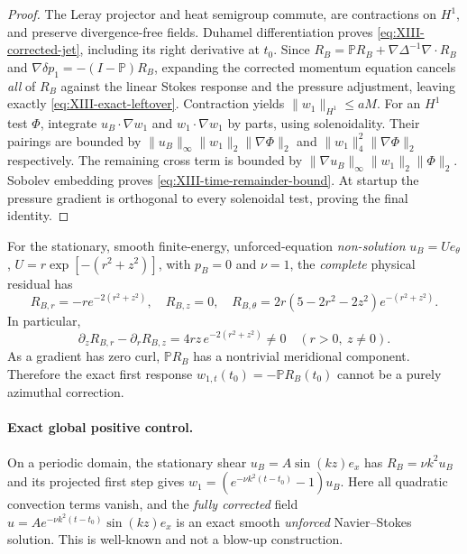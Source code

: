 \begin{proof}
The Leray projector and heat semigroup commute, are contractions on $H^1$, and preserve divergence-free fields. Duhamel differentiation proves \eqref{eq:XIII-corrected-jet}, including its right derivative at $t_0$. Since $R_B=\mathbb PR_B+\nabla\Delta^{-1}\nabla\cdot R_B$ and $\nabla\delta p_1=-(I-\mathbb P)R_B$, expanding the corrected momentum equation cancels \emph{all} of $R_B$ against the linear Stokes response and the pressure adjustment, leaving exactly \eqref{eq:XIII-exact-leftover}. Contraction yields $\|w_1\|_{H^1}\le aM$. For an $H^1$ test $\Phi$, integrate $u_B\cdot\nabla w_1$ and $w_1\cdot\nabla w_1$ by parts, using solenoidality. Their pairings are bounded by $\|u_B\|_\infty\|w_1\|_2\|\nabla\Phi\|_2$ and $\|w_1\|_4^2\|\nabla\Phi\|_2$ respectively. The remaining cross term is bounded by $\|\nabla u_B\|_\infty\|w_1\|_2\|\Phi\|_2$. Sobolev embedding proves \eqref{eq:XIII-time-remainder-bound}. At startup the pressure gradient is orthogonal to every solenoidal test, proving the final identity.
\end{proof}
\begin{proposition}
For the stationary, smooth finite-energy, unforced-equation \emph{non-solution} $u_B=Ue_\theta$, $U=r\exp[-(r^2+z^2)]$, with $p_B=0$ and $\nu=1$, the \emph{complete} physical residual has
\[
R_{B,r}=-r e^{-2(r^2+z^2)},\quad R_{B,z}=0,\quad
R_{B,\theta}=2r(5-2r^2-2z^2)e^{-(r^2+z^2)}.
\]
In particular,
\begin{equation}\label{eq:XIII-gaussian-curl}
\boxed{\partial_zR_{B,r}-\partial_rR_{B,z}
=4rz\,e^{-2(r^2+z^2)}\ne0\quad(r>0,\ z\ne0).}
\end{equation}
As a gradient has zero curl, $\mathbb PR_B$ has a nontrivial meridional component. Therefore the exact first response $w_{1,t}(t_0)=-\mathbb PR_B(t_0)$ cannot be a purely azimuthal correction.
\end{proposition}
\paragraph{Exact global positive control.} On a periodic domain, the stationary shear $u_B=A\sin(kz)e_x$ has $R_B=\nu k^2u_B$ and its projected first step gives $w_1=(e^{-\nu k^2(t-t_0)}-1)u_B$. Here all quadratic convection terms vanish, and the \emph{fully corrected} field $u=Ae^{-\nu k^2(t-t_0)}\sin(kz)e_x$ is an exact smooth \emph{unforced} Navier--Stokes solution. This is well-known and not a blow-up construction.
